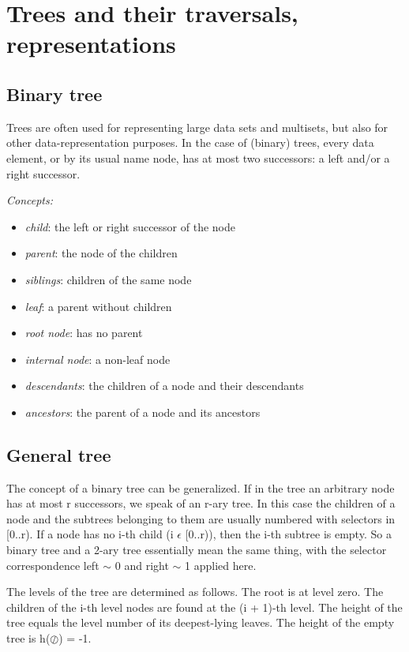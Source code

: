 \documentclass[margin=0px]{article}
\begin{document}
\section{Trees and their traversals, representations}

\subsection{Binary tree}

Trees are often used for representing large data sets and multisets,
but also for other data-representation purposes.
In the case of (binary) trees, every data element, or by its usual name node,
has at most two successors: a left and/or a
right successor.

\textit{Concepts:}
\begin{itemize}
    \item \textit{child}: the left or right successor of the node
    \item \textit{parent}: the node of the children
    \item \textit{siblings}: children of the same node
    \item \textit{leaf}: a parent without children
    \item \textit{root node}: has no parent
    \item \textit{internal node}: a non-leaf node
    \item \textit{descendants}: the children of a node and their descendants
    \item \textit{ancestors}: the parent of a node and its ancestors
\end{itemize}

\subsection{General tree}
The concept of a binary tree can be generalized. If in the tree an arbitrary node has at most r successors, we speak of an r-ary tree. In this case the children of a node and the subtrees belonging to them are usually numbered with selectors in [0..r). If a node has no i-th child (i $\epsilon$  [0..r)), then the i-th
subtree is empty. So a binary tree and a 2-ary tree essentially mean the same thing, with
the selector correspondence left $\sim$  0 and right $\sim$ 1 applied here.

The levels of the tree are determined as follows. The root is at level zero. The children of
the i-th level nodes are found at the (i + 1)-th level. The height of the tree equals the level number of its deepest-lying leaves. The height of the empty tree is h($\oslash$) = -1.
\end{document}
